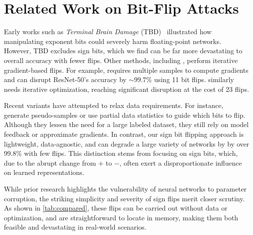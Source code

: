 \section{Related Work on Bit-Flip Attacks}
\label{sec:related}
Early works such as \textit{Terminal Brain Damage} (TBD)~\citet{TBD} illustrated how manipulating exponent bits could severely harm floating-point networks. However, TBD excludes sign bits, which we find can be far more devastating to overall accuracy with fewer flips.  
Other methods, including \citep{BFA, DeepHammer}, perform iterative gradient-based flips. For example, \citet{BFA} requires multiple samples to compute gradients and can disrupt ResNet-50’s accuracy by $\sim99.7\%$ using 11 bit flips. %
\citet{DeepHammer} similarly needs iterative optimization, reaching significant disruption at the cost of 23 flips.  

Recent variants have attempted to relax data requirements. For instance, \citep{ghavami2021bdfa, park2021zebra} generate pseudo-samples or use partial data statistics to guide which bits to flip. Although they lessen the need for a large labeled dataset, they still rely on model feedback or approximate gradients. In contrast, our sign bit flipping approach is lightweight, data-agnostic, and can degrade a large variety of networks by by over $99.8\%$ with few flips. This distinction stems from focusing on sign bits, which, due to the abrupt change from $+$ to $-$, often exert a disproportionate influence on learned representations.

While prior research highlights the vulnerability of neural networks to parameter corruption, the striking simplicity and severity of sign flips merit closer scrutiny. As shown in \cref{tab:compared}, these flips can be carried out without data or optimization, and are straightforward to locate in memory, making them both feasible and devastating in real-world scenarios.